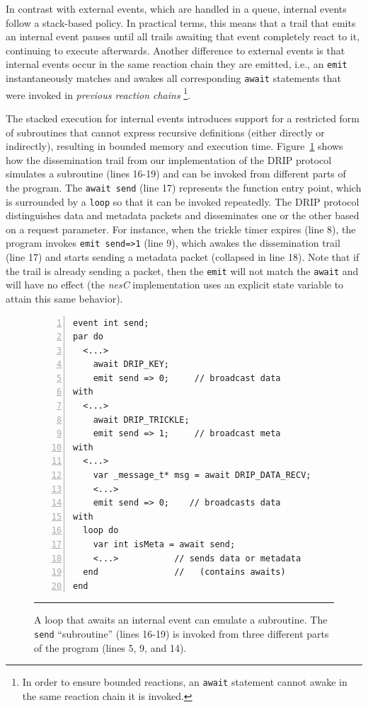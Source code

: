 \documentclass[letterpaper]{sig-alternate}
\newcommand{\code}[1] {{\small{\texttt{#1}}}}
\begin{document}
In contrast with external events, which are handled in a queue, internal events 
follow a stack-based policy.
In practical terms, this means that a trail that emits an internal event pauses 
until all trails awaiting that event completely react to it, continuing to 
execute afterwards.
%
Another difference to external events is that internal events occur in the same 
reaction chain they are emitted, i.e., an \code{emit} instantaneously matches 
and awakes all corresponding \code{await} statements that were invoked in 
\emph{previous reaction chains}%
\footnote{In order to ensure bounded reactions, an \code{await} statement 
cannot awake in the same reaction chain it is invoked.}.

The stacked execution for internal events introduces support for a restricted 
form of subroutines that cannot express recursive definitions (either directly 
or indirectly), resulting in bounded memory and execution time.
%
Figure~\ref{lst.func} shows how the dissemination trail from our implementation 
of the DRIP protocol simulates a subroutine (lines 16-19) and can be invoked 
from different parts of the program.
The \code{await send} (line 17) represents the function entry point, which is 
surrounded by a \code{loop} so that it can be invoked repeatedly.
The DRIP protocol distinguishes data and metadata packets and disseminates one 
or the other based on a request parameter.
For instance, when the trickle timer expires (line 8), the program invokes 
\code{emit~send=>1} (line 9), which awakes the dissemination trail (line 17) 
and starts sending a metadata packet (collapsed in line 18).
Note that if the trail is already sending a packet, then the \code{emit} will 
not match the \code{await} and will have no effect (the \emph{nesC} 
implementation uses an explicit state variable to attain this same behavior).



\begin{figure}[t]
\begin{lstlisting}[numbers=left,xleftmargin=2.5em]
event int send;
par do
  <...>
    await DRIP_KEY;
    emit send => 0;     // broadcast data
with
  <...>
    await DRIP_TRICKLE;
    emit send => 1;     // broadcast meta
with
  <...>
    var _message_t* msg = await DRIP_DATA_RECV;
    <...>
    emit send => 0;    // broadcasts data
with
  loop do
    var int isMeta = await send;
    <...>           // sends data or metadata
  end               //   (contains awaits)
end
\end{lstlisting}
\rule{8.5cm}{0.37pt}
\caption{ A loop that awaits an internal event can emulate a subroutine.  \newline
{\small %
The \code{send} ``subroutine'' (lines 16-19) is invoked from three different 
parts of the program (lines 5, 9, and 14).
}%
\label{lst.func}
}
\end{figure}
\end{document}

